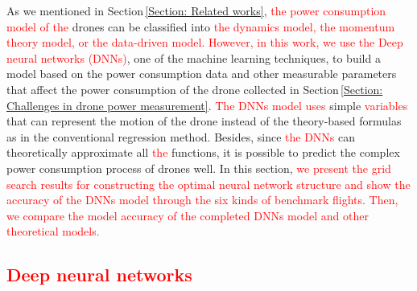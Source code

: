 \documentclass[journal]{./template/IEEEtran}
\begin{document}
As we mentioned in Section\,\ref{Section: Related works}, \textcolor{red}{the power consumption model of the} drones can be classified into \textcolor{red}{the dynamics model, the momentum theory model, or the data-driven model. 
However, in this work, we use the Deep neural networks (DNNs)}, one of the machine learning techniques, to build a model based on the power consumption data and other measurable parameters that affect the power consumption of the drone collected in Section\,\ref{Section: Challenges in drone power measurement}.
\textcolor{red}{The DNNs model uses} simple \textcolor{red}{variables} that can represent the motion of the drone instead of the theory-based formulas as in the conventional regression method. 
Besides, since \textcolor{red}{the DNNs} can theoretically approximate all \textcolor{red}{the} functions, it is possible to predict the complex power consumption process of drones well.
In this section, \textcolor{red}{we present the grid search results for constructing the optimal neural network structure and show the accuracy of the DNNs model through the six kinds of benchmark flights.
Then, we compare the model accuracy of the completed DNNs model and other theoretical models.}



\subsection{\textcolor{red}{Deep neural networks}}
\end{document}
